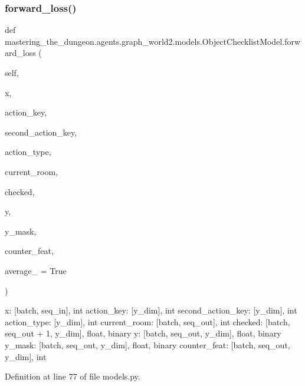 \subsubsection{\texorpdfstring{forward\+\_\+loss()}{forward\_loss()}}
{\footnotesize\ttfamily def mastering\+\_\+the\+\_\+dungeon.\+agents.\+graph\+\_\+world2.\+models.\+Object\+Checklist\+Model.\+forward\+\_\+loss (\begin{DoxyParamCaption}\item[{}]{self,  }\item[{}]{x,  }\item[{}]{action\+\_\+key,  }\item[{}]{second\+\_\+action\+\_\+key,  }\item[{}]{action\+\_\+type,  }\item[{}]{current\+\_\+room,  }\item[{}]{checked,  }\item[{}]{y,  }\item[{}]{y\+\_\+mask,  }\item[{}]{counter\+\_\+feat,  }\item[{}]{average\+\_\+ = {\ttfamily True} }\end{DoxyParamCaption})}

\begin{DoxyVerb}x: [batch, seq_in], int
action_key: [y_dim], int
second_action_key: [y_dim], int
action_type: [y_dim], int
current_room: [batch, seq_out], int
checked: [batch, seq_out + 1, y_dim], float, binary
y: [batch, seq_out, y_dim], float, binary
y_mask: [batch, seq_out, y_dim], float, binary
counter_feat: [batch, seq_out, y_dim], int
\end{DoxyVerb}
 

Definition at line 77 of file models.\+py.



